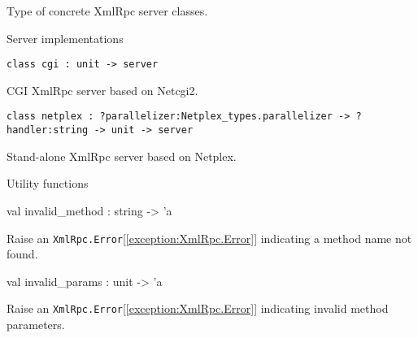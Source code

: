 \documentclass[11pt]{article}
\begin{document}
\begin{ocamldocdescription}
Type of concrete XmlRpc server classes.


\end{ocamldocdescription}




Server implementations



\begin{ocamldoccode}
{\tt{class cgi : }}{\tt{unit -> }}{\tt{server}}\end{ocamldoccode}
\label{class:XmlRpcServer.cgi}



\begin{ocamldocdescription}
CGI XmlRpc server based on Netcgi2.


\end{ocamldocdescription}




\begin{ocamldoccode}
{\tt{class netplex : }}{\tt{?parallelizer:Netplex\_types.parallelizer -> ?handler:string -> unit -> }}{\tt{server}}\end{ocamldoccode}
\label{class:XmlRpcServer.netplex}



\begin{ocamldocdescription}
Stand-alone XmlRpc server based on Netplex.


\end{ocamldocdescription}




Utility functions



\label{val:XmlRpcServer.invalid-underscoremethod}\begin{ocamldoccode}
val invalid_method : string -> 'a
\end{ocamldoccode}
\begin{ocamldocdescription}
Raise an {\tt{XmlRpc.Error}}[\ref{exception:XmlRpc.Error}] indicating a method name not found.


\end{ocamldocdescription}




\label{val:XmlRpcServer.invalid-underscoreparams}\begin{ocamldoccode}
val invalid_params : unit -> 'a
\end{ocamldoccode}
\begin{ocamldocdescription}
Raise an {\tt{XmlRpc.Error}}[\ref{exception:XmlRpc.Error}] indicating invalid method parameters.


\end{ocamldocdescription}
\end{document}
